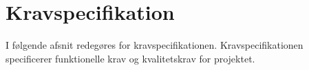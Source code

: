 \chapter{Kravspecifikation}
I følgende afsnit redegøres for kravspecifikationen. Kravspecifikationen specificerer funktionelle krav og kvalitetskrav for projektet.


